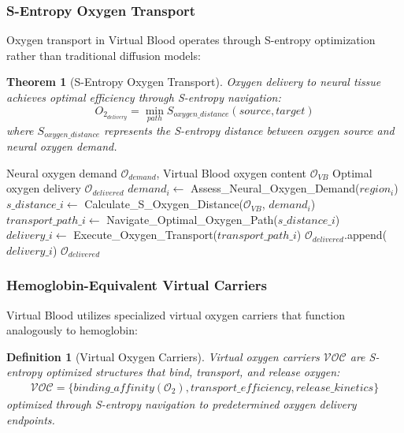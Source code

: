 \documentclass[12pt,a4paper]{article}
\newtheorem{theorem}{Theorem}
\newtheorem{definition}{Definition}
\begin{document}
\subsubsection{S-Entropy Oxygen Transport}

Oxygen transport in Virtual Blood operates through S-entropy optimization rather than traditional diffusion models:

\begin{theorem}[S-Entropy Oxygen Transport]
Oxygen delivery to neural tissue achieves optimal efficiency through S-entropy navigation:
\begin{equation}
O_2_{delivery} = \min_{path} S_{oxygen\_distance}(source, target)
\end{equation}
where $S_{oxygen\_distance}$ represents the S-entropy distance between oxygen source and neural oxygen demand.
\end{theorem}

\begin{algorithm}
\caption{S-Entropy Oxygen Delivery}
\begin{algorithmic}[1]
\REQUIRE Neural oxygen demand $\mathcal{O}_{demand}$, Virtual Blood oxygen content $\mathcal{O}_{VB}$
\ENSURE Optimal oxygen delivery $\mathcal{O}_{delivered}$
    \STATE $demand_i \leftarrow$ Assess\_Neural\_Oxygen\_Demand($region_i$)
    \STATE $s\_distance\_i \leftarrow$ Calculate\_S\_Oxygen\_Distance($\mathcal{O}_{VB}$, $demand_i$)
    \STATE $transport\_path\_i \leftarrow$ Navigate\_Optimal\_Oxygen\_Path($s\_distance\_i$)
    \STATE $delivery\_i \leftarrow$ Execute\_Oxygen\_Transport($transport\_path\_i$)
    \STATE $\mathcal{O}_{delivered}$.append($delivery\_i$)
\ENDFOR
\RETURN $\mathcal{O}_{delivered}$
\end{algorithmic}
\end{algorithm}

\subsubsection{Hemoglobin-Equivalent Virtual Carriers}

Virtual Blood utilizes specialized virtual oxygen carriers that function analogously to hemoglobin:

\begin{definition}[Virtual Oxygen Carriers]
Virtual oxygen carriers $\mathcal{VOC}$ are S-entropy optimized structures that bind, transport, and release oxygen:
\begin{align}
\mathcal{VOC} = \{binding\_affinity(\mathcal{O}_2), transport\_efficiency, release\_kinetics\}
\end{align}
optimized through S-entropy navigation to predetermined oxygen delivery endpoints.
\end{definition}
\end{document}
